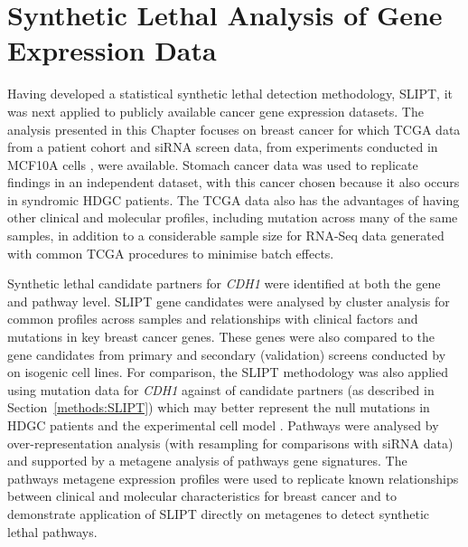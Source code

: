\chapter{Synthetic Lethal Analysis of Gene Expression Data}
\label{chap:SLIPT}

Having developed a statistical \gls{synthetic lethal} detection methodology, \gls{SLIPT}, it was next applied to publicly available cancer \gls{gene expression} datasets. The analysis presented in this Chapter focuses on breast cancer for which  \gls{TCGA}  data \citep{TCGA2012} from a patient cohort and \gls{siRNA} screen data, from experiments conducted in MCF10A cells \citep{Telford2015}, were available. Stomach cancer data \citep{TCGA2014GC} was used to replicate findings in an independent dataset, with this cancer chosen because it also occurs in syndromic \gls{HDGC} patients. The \gls{TCGA} data also has the advantages of having other clinical and molecular profiles, including  \gls{mutation} across many of the same samples, in addition to a considerable sample size for \gls{RNA-Seq}  data generated with common \gls{TCGA} procedures to minimise batch effects. %

Synthetic lethal candidate partners for \textit{CDH1} were identified at both the gene and \gls{pathway} level. \gls{SLIPT} gene candidates were analysed by cluster analysis for common  profiles across samples and relationships with clinical factors and \glspl{mutation} in key breast cancer genes. These genes were also compared to the gene candidates from primary and secondary (validation) screens conducted by \citet{Telford2015} on isogenic cell lines. For comparison, the \gls{SLIPT} methodology was also applied using \gls{mutation} data for \textit{CDH1} against  of candidate partners (as described in Section~\ref{methods:SLIPT}) which may better represent the null \glspl{mutation} in \gls{HDGC} patients and the experimental cell model \citep{Chen2014}. Pathways were analysed by over-representation analysis (with resampling for comparisons with \gls{siRNA} data) and supported by a \gls{metagene} analysis of \glspl{pathway} gene signatures. The \glspl{pathway} meta\gls{gene expression} profiles were used to replicate known relationships between clinical and molecular characteristics for breast cancer and to demonstrate application of \gls{SLIPT} directly on \glspl{metagene} to detect \gls{synthetic lethal} \glspl{pathway}.

